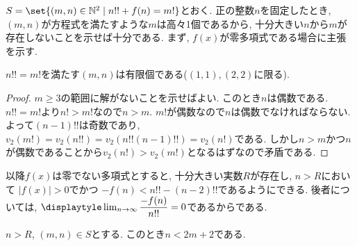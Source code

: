  $S=\set{(m,n) \in \mathbb{N}^2 \mid n!! + f(n) = m!}$とおく. 正の整数$n$を固定したとき, $(m,n)$が方程式を満たすような$m$は高々1個であるから, 十分大きい$n$から$m$が存在しないことを示せば十分である. まず, $f(x)$が零多項式である場合に主張を示す.

\begin{claim}
$n!! = m!$を満たす$(m,n)$は有限個である($(1,1), (2,2)$に限る).
\end{claim}
\begin{proof}
 $m\geq 3$の範囲に解がないことを示せばよい. このとき$n$は偶数である. $n!! = m!$より$n! > m!$なので$n>m$.
 $m!$が偶数なので$n$は偶数でなければならない. よって$(n-1)!!$は奇数であり, $v_2(m!) = v_2(n!!) = v_2(n!!(n-1)!!) = v_2(n!)$である. しかし$n>m$かつ$n$が偶数であることから$v_2(n!) > v_2(m!)$となるはずなので矛盾である.
\end{proof}



以降$f(x)$は零でない多項式とすると, 十分大きい実数$R$が存在し, $n>R$において%
$|f(x)| > 0$でかつ
$-f(n) < n!! - (n-2)!!$であるようにできる. 後者については, $\displaytyle\lim_{n\to \infty} \dfrac{-f(n)}{n!!} = 0$であるからである.
\begin{claim}
$n>R$, $(m,n) \in S$とする. このとき$n<2m+2$である.
\end{claim}

